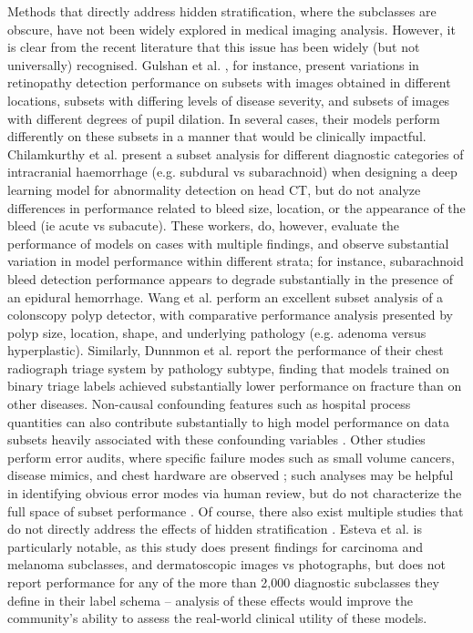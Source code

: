 \documentclass{article}
\begin{document}
Methods that directly address hidden stratification, where the subclasses are obscure, have not been widely explored in medical imaging analysis.  However, it is clear from the recent literature that this issue has been widely (but not universally) recognised.  
Gulshan et al. \citep{Gulshan2016-we}, for instance, present variations in retinopathy detection performance on subsets with images obtained in different locations, subsets with differing levels of disease severity, and subsets of images with different degrees of pupil dilation.  
In several cases, their models perform differently on these subsets in a manner that would be clinically impactful.  Chilamkurthy et al. \citep{Chilamkurthy2018-op}  present a subset analysis for different diagnostic categories of intracranial haemorrhage (e.g. subdural vs subarachnoid) when designing a deep learning model for abnormality detection on head CT, but do not analyze differences in  performance related to bleed size, location, or the appearance of the bleed (ie acute vs subacute). 
 These workers, do, however, evaluate the performance of models on cases with multiple findings, and observe substantial variation in model performance within different strata; for instance, subarachnoid bleed detection performance appears to degrade substantially in the presence of an epidural hemorrhage.  
Wang et al. \citep{Wang2019-jr} perform an excellent subset analysis of a colonscopy polyp detector, with comparative performance analysis presented by polyp size, location, shape, and underlying pathology (e.g. adenoma versus hyperplastic).  
 Similarly, Dunnmon et al. \citep{Dunnmon2019-rr} report the performance of their chest radiograph triage system by pathology subtype, finding that models trained on binary triage labels achieved substantially lower performance on fracture than on other diseases.   
Non-causal confounding features such as hospital process quantities can also contribute substantially to high model performance on data subsets heavily associated with these confounding variables \citep{Winkler2019-fw, Badgeley2019-zi, Agniel2018-qp, Zech2018-xq}.
 Other studies perform error audits, where specific failure modes such as small volume cancers, disease mimics, and chest hardware are observed \citep{Taylor2018-ak, Campanella2019-qs}; such analyses may be helpful in identifying obvious error modes via human review, but do not characterize the full space of subset performance \citep{Selbst2017-gz}.  
 Of course, there also exist multiple studies that do not directly address the effects of hidden stratification \citep{Haenssle2018-vw, Bien2018-ae}. 
 Esteva et al. \citep{Esteva2017-if} is particularly notable, as this study does present findings for carcinoma and melanoma subclasses, and dermatoscopic images vs photographs, but does not report performance for any of the more than 2,000 diagnostic subclasses they define in their label schema -- analysis of these effects would improve the community's ability to assess the real-world clinical utility of these models. 
 
\end{document}
